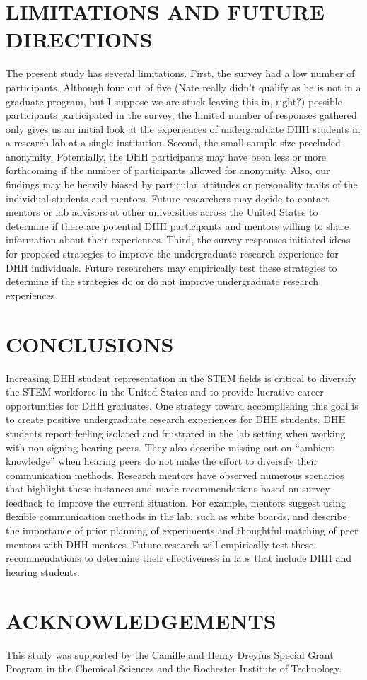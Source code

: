 \documentclass[11.5pt]{sig-alternate} %
\begin{document}
\begin{large}
\section*{LIMITATIONS AND FUTURE DIRECTIONS}

The present study has several limitations. First, the survey had a low number of participants. Although four out of five (Nate really didn’t qualify as he is not in a graduate program, but I suppose we are stuck leaving this in, right?) possible participants participated in the survey, the limited number of responses gathered only gives us an initial look at the experiences of undergraduate DHH students in a research lab at a single institution. Second, the small sample size precluded anonymity. Potentially, the DHH participants may have been less or more forthcoming if the number of participants allowed for anonymity. Also, our findings may be heavily biased by particular attitudes or personality traits of the individual students and mentors. Future researchers may decide to contact mentors or lab advisors at other universities across the United States to determine if there are potential DHH participants and mentors willing to share information about their experiences. Third, the survey responses initiated ideas for proposed strategies to improve the undergraduate research experience for DHH individuals. Future researchers may empirically test these strategies to determine if the strategies do or do not improve undergraduate research experiences. 

\section*{CONCLUSIONS}

Increasing DHH student representation in the STEM fields is critical to diversify the STEM workforce in the United States and to provide lucrative career opportunities for DHH graduates. One strategy toward accomplishing this goal is to create positive undergraduate research experiences for DHH students. DHH students report feeling isolated and frustrated in the lab setting when working with non-signing hearing peers. They also describe missing out on “ambient knowledge” when hearing peers do not make the effort to diversify their communication methods. Research mentors have observed numerous scenarios that highlight these instances and made recommendations based on survey feedback to improve the current situation. For example, mentors suggest using flexible communication methods in the lab, such as white boards, and describe the importance of prior planning of experiments and thoughtful matching of peer mentors with DHH mentees. Future research will empirically test these recommendations to determine their effectiveness in labs that include DHH and hearing students.

\section*{ACKNOWLEDGEMENTS}

This study was supported by the Camille and Henry Dreyfus Special Grant Program in the Chemical Sciences and the Rochester Institute of Technology. 

\end{large}
\end{document}

